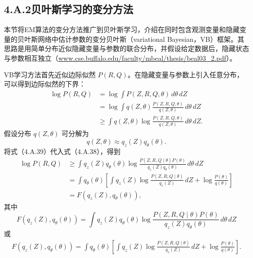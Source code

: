 \subsection*{4.A.2\quad 贝叶斯学习的变分方法}

本节将EM算法的变分方法推广到贝叶斯学习，介绍在同时包含观测变量和隐藏变量的贝叶斯网络中估计参数的变分贝叶斯（variational Bayesian，VB）框架。其思路是用简单分布近似隐藏变量与参数的联合分布，并假设给定数据后，隐藏状态与参数相互独立（\url{www.cse.buffalo.edu/faculty/mbeal/thesis/beal03_2.pdf}）。

VB学习方法首先近似边际似然 $P(R,Q)$。在隐藏变量与参数上引入任意分布，可以得到边际似然的下界：
\begin{equation}
\begin{aligned}
\log P(R,Q)&=\log\int P(Z,R,Q,\theta)\,d\theta\,dZ\\
&=\log\int q(Z,\theta)\frac{P(Z,R,Q,\theta)}{q(Z,\theta)}\,d\theta\,dZ\\
&\ge\int q(Z,\theta)\log\frac{P(Z,R,Q,\theta)}{q(Z,\theta)}\,d\theta\,dZ.
\end{aligned}\tag{4.A.38}
\end{equation}
假设分布 $q(Z,\theta)$ 可分解为
\begin{equation}
q(Z,\theta)\approx q_z(Z)q_\theta(\theta).\tag{4.A.39}
\end{equation}
将式（4.A.39）代入式（4.A.38），得到
\begin{equation}
\begin{aligned}
\log P(R,Q)&\ge\int q_z(Z)q_\theta(\theta)
 \log\frac{P(Z,R,Q\mid\theta)P(\theta)}{q_z(Z)q_\theta(\theta)}\,d\theta\,dZ\\
&=\int q_\theta(\theta)\left[
 \int q_z(Z)\log\frac{P(Z,R,Q\mid\theta)}{q_z(Z)}\,dZ
 +\log\frac{P(\theta)}{q(\theta)}\right]\\
&=F(q_z(Z),q_\theta(\theta)),
\end{aligned}\tag{4.A.40}
\end{equation}
其中
\begin{equation}
F(q_z(Z),q_\theta(\theta))=
\int q_z(Z)q_\theta(\theta)
 \log\frac{P(Z,R,Q\mid\theta)P(\theta)}{q_z(Z)q_\theta(\theta)}\,d\theta\,dZ\tag{4.A.41}
\end{equation}
或
\begin{equation}
\begin{aligned}
F(q_z(Z),q_\theta(\theta))=
\int q_\theta(\theta)\left[
\int q_z(Z)\log\frac{P(Z,R,Q\mid\theta)}{q_z(Z)}\,dZ
+\log\frac{P(\theta)}{q(\theta)}\right].
\end{aligned}\tag{4.A.42}
\end{equation}
